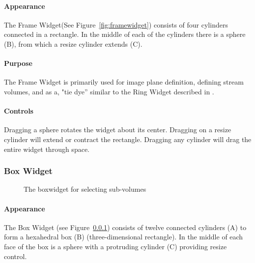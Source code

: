 \paragraph{Appearance} The
Frame Widget(See Figure~\ref{fig:framewidget}) consists of four cylinders connected in a rectangle.  In
the middle of each of the cylinders there is a sphere (B), from which
a resize cylinder extends (C).

\paragraph{Purpose} The Frame Widget is primarily used for image
plane definition, defining stream volumes, and as a, "tie dye'' similar to
the Ring Widget described in .

\paragraph{Controls} Dragging a sphere rotates the widget about its center. Dragging on a resize cylinder will extend or contract the rectangle.
Dragging any cylinder will drag the entire widget through space.


\subsubsection{Box Widget}
\label{sec:view-boxwidget} 

\begin{figure}[htb]
  \begin{makeimage}
  \end{makeimage}
  \boxwidget
  \caption{\label{fig:boxwidget} The boxwidget for selecting sub-volumes}
\end{figure}

\paragraph{Appearance} The Box
Widget (see Figure~\ref{sec:view-boxwidget}) consists of twelve 
connected cylinders (A) to form a hexahedral box (B) (three-dimensional
rectangle).  In the middle of each face of the box is a sphere with a protruding cylinder (C) providing resize control.

